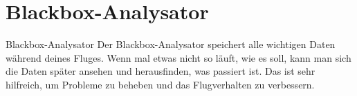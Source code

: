   \section{Blackbox-Analysator }  Blackbox-Analysator
Der Blackbox-Analysator speichert alle wichtigen Daten während deines Fluges. Wenn mal etwas nicht so läuft, wie es soll, kann man sich die Daten später ansehen und herausfinden, was passiert ist. Das ist sehr hilfreich, um Probleme zu beheben und das Flugverhalten zu verbessern. 









